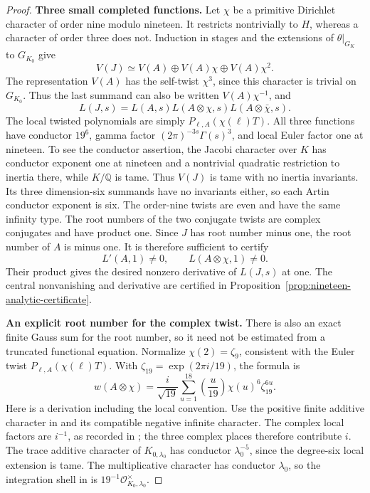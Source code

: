 \begin{proof}
\par\medskip\noindent\textbf{Three small completed functions.} 
Let $\chi$ be a primitive Dirichlet character of order nine
modulo nineteen.  It restricts nontrivially to $H$, whereas
a character of order three does not.  Induction in stages
and the extensions of $\theta|_{G_K}$ to $G_{K_0}$ give
\[
 V(J)\simeq V(A)\oplus V(A)\chi\oplus V(A)\chi^2.
\]
The representation $V(A)$ has the self-twist $\chi^3$,
since this character is trivial on $G_{K_0}$.  Thus the
last summand can also be written $V(A)\chi^{-1}$, and
\[
 L(J,s)=L(A,s)L(A\otimes\chi,s)L(A\otimes\bar\chi,s).
\]
The local twisted polynomials are simply
$P_{\ell,A}(\chi(\ell)T)$.  All three functions have
conductor $19^6$, gamma factor $(2\pi)^{-3s}\Gamma(s)^3$,
and local Euler factor one at nineteen.  To see the
conductor assertion, the Jacobi character over $K$ has
conductor exponent one at nineteen and a nontrivial
quadratic restriction to inertia there, while $K/\mathbb Q$
is tame.  Thus $V(J)$ is tame with no inertia invariants.
Its three dimension-six summands have no invariants
either, so each Artin conductor exponent is six.  The
order-nine twists are even and have the same infinity
type.  The root numbers of the two conjugate twists are
complex conjugates and have product one.  Since $J$ has
root number minus one, the root number of $A$ is minus one.
It is therefore sufficient to certify
\[
 L'(A,1)\ne0,\qquad L(A\otimes\chi,1)\ne0.
\]
Their product gives the desired nonzero derivative of
$L(J,s)$ at one.  The central nonvanishing and derivative are certified in
Proposition~\ref{prop:nineteen-analytic-certificate}.

\par\medskip\noindent\textbf{An explicit root number for the complex twist.} 
There is also an exact finite Gauss sum for the root number,
so it need not be estimated from a truncated functional
equation.  Normalize $\chi(2)=\zeta_9$, consistent with
the Euler twist $P_{\ell,A}(\chi(\ell)T)$.  With
$\zeta_{19}=\exp(2\pi i/19)$, the formula is
\[
 w(A\otimes\chi)=
 \frac{i}{\sqrt{19}}\sum_{u=1}^{18}
       \left(\frac{u}{19}\right)\chi(u)^6\zeta_{19}^{6u}.
\]
Here is a derivation including the local convention.
Use the positive finite additive character in \citet[\S3.1, equation~(3.4), author p.~9]{ShuExpanded2021} and its compatible
negative infinite character.  The complex local factors
are $i^{-1}$, as recorded in \citet[\S3.3, author p.~13]{ShuExpanded2021};
the three complex places therefore contribute $i$.
The trace additive character of $K_{0,\lambda_0}$ has
conductor $\lambda_0^{-5}$, since the degree-six local
extension is tame.  The multiplicative character has
conductor $\lambda_0$, so the integration shell in \citet[equation~(3.2), author p.~9]{ShuExpanded2021} is
$19^{-1}\mathcal O_{K_0,\lambda_0}^{\times}$.


\end{proof}
